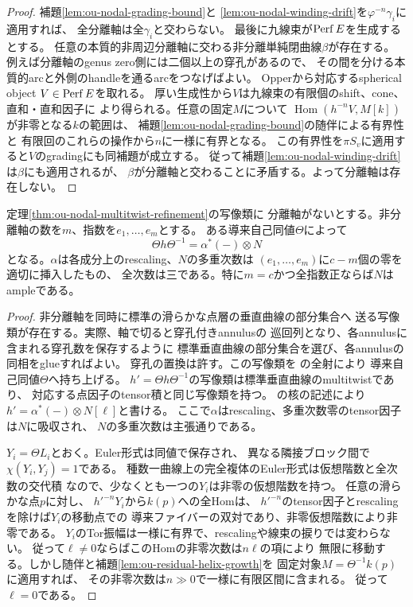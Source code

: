 \begin{proof}
補題\ref{lem:ou-nodal-grading-bound}と
\ref{lem:ou-nodal-winding-drift}を$\varphi^{-n}\gamma_i$に適用すれば、
全分離軸は全$\gamma_i$と交わらない。
最後に九線束が$\operatorname{Perf} E$を生成するとする。
任意の本質的非周辺分離軸に交わる非分離単純閉曲線$\beta$が存在する。
例えば分離軸のgenus zero側には二個以上の穿孔があるので、
その間を分ける本質的arcと外側のhandleを通るarcをつなげばよい。
Opper\cite[Theorem~7.1]{Opper2026}から対応するspherical object
$V\in\operatorname{Perf} E$を取れる。
厚い生成性から$V$は九線束の有限個のshift、cone、直和・直和因子に
より得られる。任意の固定$M$について
$\operatorname{Hom}(h^{-n}V,M[k])$が非零となる$k$の範囲は、
補題\ref{lem:ou-nodal-grading-bound}の随伴による有界性と
有限回のこれらの操作から$n$に一様に有界となる。
この有界性を$\pi S_v$に適用すると$V$のgradingにも同補題が成立する。
従って補題\ref{lem:ou-nodal-winding-drift}は$\beta$にも適用されるが、
$\beta$が分離軸と交わることに矛盾する。よって分離軸は存在しない。
\end{proof}

\begin{proposition}[分離軸がない場合の幾何的共役]
\label{prop:ou-nodal-conjugate-geometric}
定理\ref{thm:ou-nodal-multitwist-refinement}の写像類に
分離軸がないとする。非分離軸の数を$m$、指数を$e_1,\dots,e_m$とする。
ある導来自己同値$\Theta$によって
\[
 \Theta h\Theta^{-1}=\alpha^*(-)\otimes N
\]
となる。$\alpha$は各成分上のrescaling、$N$の多重次数は
$(e_1,\dots,e_m)$に$c-m$個の零を適切に挿入したもの、
全次数は三である。特に$m=c$かつ全指数正ならば$N$はampleである。
\end{proposition}
\begin{proof}
非分離軸を同時に標準の滑らかな点層の垂直曲線の部分集合へ
送る写像類が存在する。実際、軸で切ると穿孔付きannulusの
巡回列となり、各annulusに含まれる穿孔数を保存するように
標準垂直曲線の部分集合を選び、各annulusの同相をglueすればよい。
穿孔の置換は許す。この写像類を
\cite[Corollary~8.41]{Opper2026}の全射により
導来自己同値$\Theta$へ持ち上げる。
$h'=\Theta h\Theta^{-1}$の写像類は標準垂直曲線のmultitwistであり、
対応する点因子のtensor積と同じ写像類を持つ。
\cite[Proposition~8.40]{Opper2026}の核の記述により
$h'=\alpha^*(-)\otimes N[\ell]$と書ける。
ここで$\alpha$はrescaling、多重次数零のtensor因子は$N$に吸収され、
$N$の多重次数は主張通りである。

$Y_i=\Theta L_i$とおく。Euler形式は同値で保存され、
異なる隣接ブロック間で$\chi(Y_i,Y_j)=1$である。
種数一曲線上の完全複体のEuler形式は仮想階数と全次数の交代積
なので、少なくとも一つの$Y_i$は非零の仮想階数を持つ。
任意の滑らかな点$p$に対し、
$h'^{-n}Y_i$から$k(p)$への全Homは、
$h'^{-n}$のtensor因子とrescalingを除けば$Y_i$の移動点での
導来ファイバーの双対であり、非零仮想階数により非零である。
$Y_i$のTor振幅は一様に有界で、rescalingや線束の捩りでは変わらない。
従って$\ell\ne0$ならばこのHomの非零次数は$n\ell$の項により
無限に移動する。しかし随伴と補題\ref{lem:ou-residual-helix-growth}を
固定対象$M=\Theta^{-1}k(p)$に適用すれば、
その非零次数は$n\gg0$で一様に有限区間に含まれる。
従って$\ell=0$である。
\end{proof}

